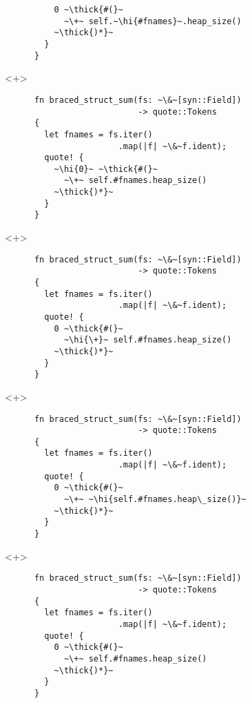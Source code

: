 \documentclass[usepdftitle=false]{beamer}
\renewcommand{\&}{\makebox[\widthof{\ampersand}][c]{\scalebox{0.9}[1.0]{\Book\ampersand}}}
\newcommand{\+}{\makebox[\widthof{+}][c]{\raisebox{-.2\height}{\scalefont{1.5}\Light+}}}
\newcommand{\thick}[1]{\contourlength{0.12pt}\contour[10]{black}{#1}}
\newcommand{\hi}[1]{%
\tikz[baseline=(A.base)]
 \node[highlighting=0,inner sep=0pt,text depth=0pt] (A) {#1};%
}
\begin{document}
\begin{frame}[fragile]
\begin{onlyenv}
\begin{verbatim}
          0 ~\thick{#(}~
            ~\+~ self.~\hi{#fnames}~.heap_size()
          ~\thick{)*}~
        }
      }
    \end{verbatim}
  \end{onlyenv}
  \begin{onlyenv}<+>
    \begin{verbatim}
      fn braced_struct_sum(fs: ~\&~[syn::Field])
                           -> quote::Tokens
      {
        let fnames = fs.iter()
                       .map(|f| ~\&~f.ident);
        quote! {
          ~\hi{0}~ ~\thick{#(}~
            ~\+~ self.#fnames.heap_size()
          ~\thick{)*}~
        }
      }
    \end{verbatim}
  \end{onlyenv}
  \begin{onlyenv}<+>
    \begin{verbatim}
      fn braced_struct_sum(fs: ~\&~[syn::Field])
                           -> quote::Tokens
      {
        let fnames = fs.iter()
                       .map(|f| ~\&~f.ident);
        quote! {
          0 ~\thick{#(}~
            ~\hi{\+}~ self.#fnames.heap_size()
          ~\thick{)*}~
        }
      }
    \end{verbatim}
  \end{onlyenv}
  \begin{onlyenv}<+>
    \begin{verbatim}
      fn braced_struct_sum(fs: ~\&~[syn::Field])
                           -> quote::Tokens
      {
        let fnames = fs.iter()
                       .map(|f| ~\&~f.ident);
        quote! {
          0 ~\thick{#(}~
            ~\+~ ~\hi{self.#fnames.heap\_size()}~
          ~\thick{)*}~
        }
      }
    \end{verbatim}
  \end{onlyenv}
  \begin{onlyenv}<+>
    \begin{verbatim}
      fn braced_struct_sum(fs: ~\&~[syn::Field])
                           -> quote::Tokens
      {
        let fnames = fs.iter()
                       .map(|f| ~\&~f.ident);
        quote! {
          0 ~\thick{#(}~
            ~\+~ self.#fnames.heap_size()
          ~\thick{)*}~
        }
      }
    \end{verbatim}
  \end{onlyenv}
\end{frame}
\end{document}
